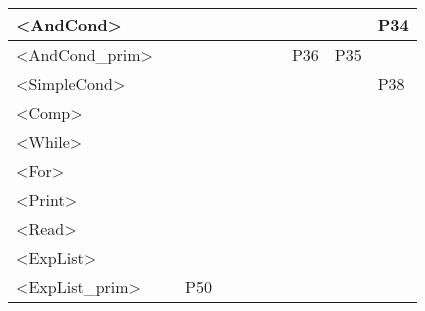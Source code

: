 \documentclass[12pt]{article}
\begin{document}
\begin{table}[H]
\begin{tabular}{|l|l|l|l|l|l|l|l|l|l|}
		\textless{}AndCond\textgreater{}         &     &     &     &      &       &      &     &     & P34 \\ \hline
		\textless{}AndCond\_prim\textgreater{}   &     &     &     &      &       &      & P36 & P35 &     \\ \hline
		\textless{}SimpleCond\textgreater{}      &     &     &     &      &       &      &     &     & P38 \\ \hline
		\textless{}Comp\textgreater{}            &     &     &     &      &       &      &     &     &     \\ \hline
		\textless{}While\textgreater{}           &     &     &     &      &       &      &     &     &     \\ \hline
		\textless{}For\textgreater{}             &     &     &     &      &       &      &     &     &     \\ \hline
		\textless{}Print\textgreater{}           &     &     &     &      &       &      &     &     &     \\ \hline
		\textless{}Read\textgreater{}            &     &     &     &      &       &      &     &     &     \\ \hline
		\textless{}ExpList\textgreater{}         &     &     &     &      &       &      &     &     &     \\ \hline
		\textless{}ExpList\_prim\textgreater{}   &     & P50 &     &      &       &      &     &     &     \\ \hline
	\end{tabular}
\end{table}
\end{document}
